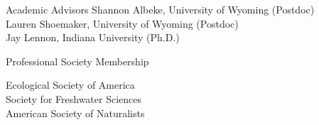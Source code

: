 \documentclass{resume} %
\begin{document}
\begin{rSection}{Academic Advisors}
Shannon Albeke, University of Wyoming (Postdoc) \\
Lauren Shoemaker, University of Wyoming (Postdoc) \\
Jay Lennon, Indiana University (Ph.D.)
\end{rSection}
\bigskip

\begin{rSection}{Professional Society Membership}

Ecological Society of America\\
Society for Freshwater Sciences\\
American Society of Naturalists\\ 

\end{rSection}

% 
% 
% 
% 
\end{document}
